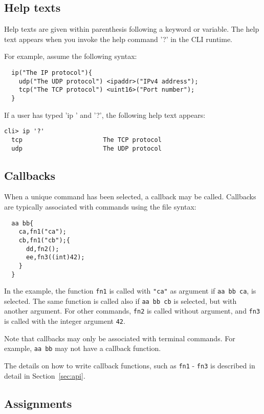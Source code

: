 \documentclass[a4paper, 10pt] {article}
\begin{document}
\subsection{Help texts}

Help texts are given within parenthesis following a keyword or
variable. The help text appears when you invoke the help command '?'
in the CLI runtime.

For example, assume the following syntax:
\begin{verbatim}
  ip("The IP protocol"){
    udp("The UDP protocol") <ipaddr>("IPv4 address");
    tcp("The TCP protocol") <uint16>("Port number");
  }
\end{verbatim}
If a user has typed 'ip ' and '?', the following help text appears:
\begin{verbatim}
cli> ip '?'
  tcp                      The TCP protocol
  udp                      The UDP protocol
\end{verbatim}

\subsection{Callbacks}
\label{sec:callbacks}

When a unique command has been selected, a callback may be
called. Callbacks are typically associated with commands using the
file syntax:
\begin{verbatim}
  aa bb{
    ca,fn1("ca");
    cb,fn1("cb");{
      dd,fn2();
      ee,fn3((int)42);
    }
  }
\end{verbatim}

In the example, the function {\tt fn1} is called with {\tt "ca"} as
argument if {\tt aa bb ca}, is selected. The same function is called
also if {\tt aa bb cb} is selected, but with another argument. For
other commands, {\tt fn2} is called without argument, and {\tt fn3} is
called with the integer argument {\tt 42}.

Note that callbacks may only be associated with terminal commands. For
example, {\tt aa bb} may not have a callback function.

The details on how to write callback functions, such as {\tt fn1} -
{\tt fn3} is described in detail in Section~\ref{sec:api}.

\subsection{Assignments}
\label{sec:assignments}
\end{document}
